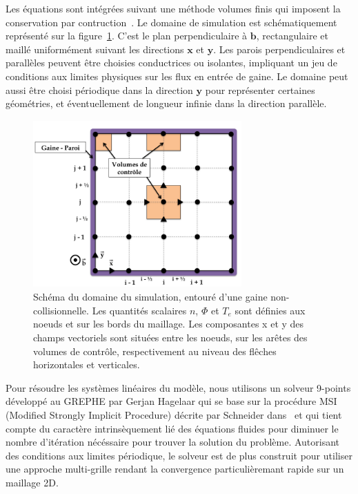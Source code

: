 \begin{refsection}
Les équations sont intégrées suivant une méthode
volumes finis qui imposent la conservation par contruction~\parencite{toro}. Le
domaine de simulation est schématiquement représenté sur la figure~\ref{3-maillage}.
C'est le plan perpendiculaire à $\mathbf{b}$, rectangulaire et maillé uniformément suivant
les directions $\mathbf{x}$ et $\mathbf{y}$. Les parois perpendiculaires
et parallèles peuvent être choisies conductrices ou isolantes, impliquant un jeu
de conditions aux limites physiques sur les flux en entrée de gaine. Le domaine
peut aussi être choisi périodique dans la direction $\mathbf y$ pour représenter
certaines géométries, et éventuellement de longueur infinie dans la direction
parallèle.
 
\begin{figure}[htbp]
\centering
\includegraphics[height=64mm,width=80mm]{figures/3-magnisGrid.png}
{\caption{Schéma du domaine du simulation, entouré d'une gaine
non-collisionnelle.
Les quantités scalaires $n$, $\Phi$ et $T_e$ sont définies aux noeuds et sur les
bords du maillage. Les composantes x et y des champs vectoriels sont
situées entre les noeuds, sur les arêtes des volumes de contrôle, respectivement
au niveau des flêches horizontales et verticales.}
\label{3-maillage}}
\end{figure}

Pour résoudre les systèmes linéaires du modèle, nous utilisons un solveur
9-points développé au GREPHE par Gerjan Hagelaar qui se base sur la procédure
MSI (Modified Strongly Implicit Procedure) décrite par Schneider
dans~\parencite{Schneider} et qui tient compte du caractère intrinsèquement lié
des équations fluides pour diminuer le nombre d'itération nécéssaire pour
trouver la solution du problème. Autorisant des conditions aux limites
périodique, le solveur est de plus construit pour utiliser une approche multi-grille
rendant la convergence particulièremant rapide sur un maillage 2D.


\end{refsection}
